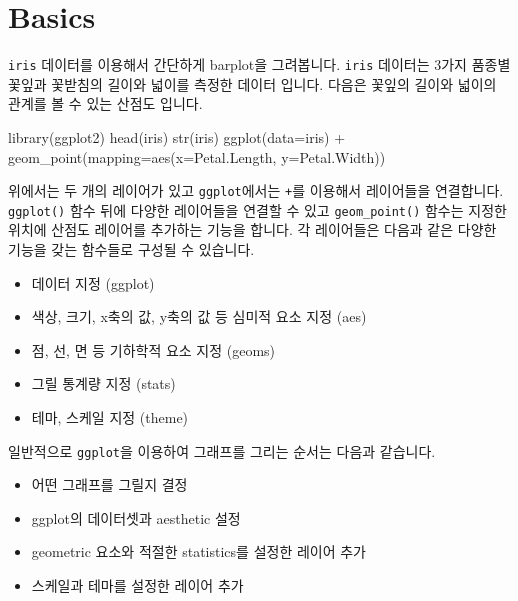 \documentclass[
]{book}
\newenvironment{Shaded}{\begin{snugshade}}{\end{snugshade}}
\newcommand{\AttributeTok}[1]{\textcolor[rgb]{0.77,0.63,0.00}{#1}}
\newcommand{\FunctionTok}[1]{\textcolor[rgb]{0.00,0.00,0.00}{#1}}
\newcommand{\NormalTok}[1]{#1}
\newcommand{\SpecialCharTok}[1]{\textcolor[rgb]{0.00,0.00,0.00}{#1}}
\providecommand{\tightlist}{%
  \setlength{\itemsep}{0pt}\setlength{\parskip}{0pt}}
\begin{document}
\hypertarget{basics}{%
\section{Basics}\label{basics}}

\texttt{iris} 데이터를 이용해서 간단하게 barplot을 그려봅니다. \texttt{iris} 데이터는 3가지 품종별 꽃잎과 꽃받침의 길이와 넓이를 측정한 데이터 입니다. 다음은 꽃잎의 길이와 넓이의 관계를 볼 수 있는 산점도 입니다.

\begin{Shaded}
\begin{Highlighting}[]
\FunctionTok{library}\NormalTok{(ggplot2)}
\FunctionTok{head}\NormalTok{(iris)}
\FunctionTok{str}\NormalTok{(iris)}
\FunctionTok{ggplot}\NormalTok{(}\AttributeTok{data=}\NormalTok{iris) }\SpecialCharTok{+}
  \FunctionTok{geom\_point}\NormalTok{(}\AttributeTok{mapping=}\FunctionTok{aes}\NormalTok{(}\AttributeTok{x=}\NormalTok{Petal.Length, }\AttributeTok{y=}\NormalTok{Petal.Width))}
\end{Highlighting}
\end{Shaded}

위에서는 두 개의 레이어가 있고 \texttt{ggplot}에서는 \texttt{+}를 이용해서 레이어들을 연결합니다. \texttt{ggplot()} 함수 뒤에 다양한 레이어들을 연결할 수 있고 \texttt{geom\_point()} 함수는 지정한 위치에 산점도 레이어를 추가하는 기능을 합니다. 각 레이어들은 다음과 같은 다양한 기능을 갖는 함수들로 구성될 수 있습니다.

\begin{itemize}
\tightlist
\item
  데이터 지정 (ggplot)
\item
  색상, 크기, x축의 값, y축의 값 등 심미적 요소 지정 (aes)
\item
  점, 선, 면 등 기하학적 요소 지정 (geoms)
\item
  그릴 통계량 지정 (stats)
\item
  테마, 스케일 지정 (theme)
\end{itemize}

일반적으로 \texttt{ggplot}을 이용하여 그래프를 그리는 순서는 다음과 같습니다.

\begin{itemize}
\tightlist
\item
  어떤 그래프를 그릴지 결정
\item
  ggplot의 데이터셋과 aesthetic 설정
\item
  geometric 요소와 적절한 statistics를 설정한 레이어 추가
\item
  스케일과 테마를 설정한 레이어 추가
\end{itemize}
\end{document}
